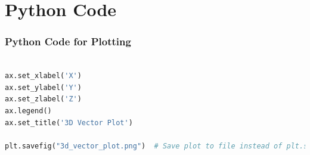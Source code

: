 \documentclass{beamer}
\theoremstyle{remark}
\numberwithin{equation}{section}
\begin{document}
\section{Python Code}
\begin{frame}[fragile]
\frametitle{Python Code for Plotting}
\begin{lstlisting}[language=Python]   

ax.set_xlabel('X')
ax.set_ylabel('Y')
ax.set_zlabel('Z')
ax.legend()
ax.set_title('3D Vector Plot')

plt.savefig("3d_vector_plot.png")  # Save plot to file instead of plt.show()

\end{lstlisting}

\end{frame}
\end{document}
